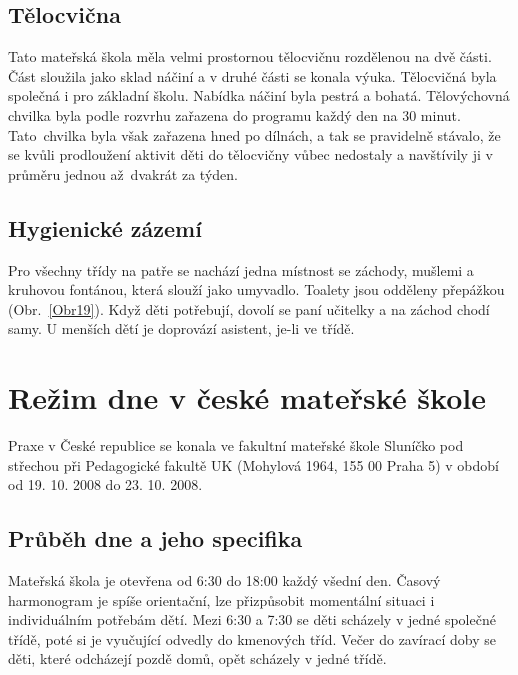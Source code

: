 		\subsection{Tělocvična}
			Tato mateřská škola měla velmi prostornou tělocvičnu rozdělenou na dvě části. Část sloužila jako sklad náčiní a v druhé části se konala výuka. Tělocvičná byla společná i pro základní školu. Nabídka náčiní byla pestrá a bohatá. Tělovýchovná chvilka byla podle rozvrhu zařazena do programu každý den na 30 minut. Tato chvilka byla však zařazena hned po dílnách, a tak se pravidelně stávalo, že se kvůli prodloužení aktivit děti do tělocvičny vůbec nedostaly a navštívily ji v průměru jednou až dvakrát za týden. 

		\subsection{Hygienické zázemí}
		\label{zachody}
			Pro všechny třídy na patře se nachází jedna místnost se záchody, mušlemi a kruhovou fontánou, která slouží jako umyvadlo. Toalety jsou odděleny přepážkou (Obr.~\ref{Obr19}). Když děti potřebují, dovolí se paní učitelky a na záchod chodí samy. U menších dětí je doprovází asistent, je-li ve třídě. 
	



\section{Režim dne v české mateřské škole}

		Praxe v České republice se konala ve fakultní mateřské škole Sluníčko pod střechou při Pedagogické fakultě UK (Mohylová 1964, 155 00 Praha 5) v období od 19. 10. 2008 do 23. 10. 2008. 

	\subsection{Průběh dne a jeho specifika}

			Mateřská škola je otevřena od 6:30 do 18:00 každý všední den. Časový harmonogram je spíše orientační, lze přizpůsobit momentální situaci i individuálním potřebám dětí. Mezi 6:30 a 7:30 se děti scházely v jedné společné třídě, poté si je vyučující odvedly do kmenových tříd. Večer do zavírací doby se děti, které odcházejí pozdě domů, opět scházely v jedné třídě.

